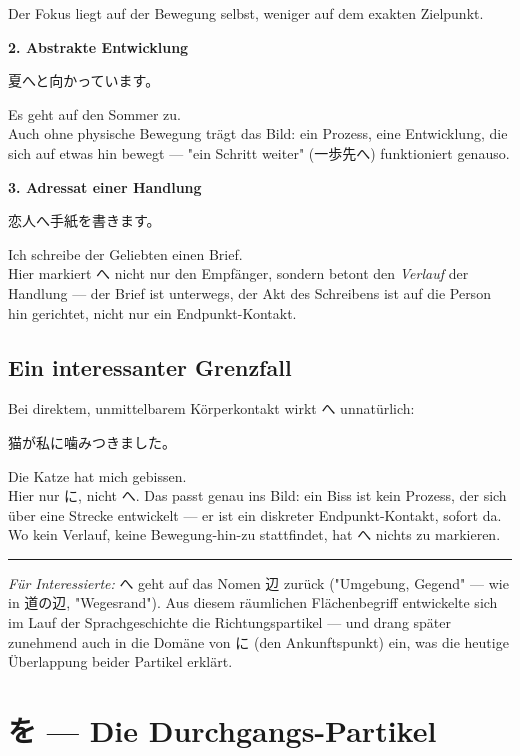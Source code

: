 \documentclass[12pt]{book}
\begin{document}
Der Fokus liegt auf der Bewegung selbst, weniger auf dem exakten Zielpunkt.

\textbf{2. Abstrakte Entwicklung}
\par\quad 夏へと向かっています。\\
\par\quad Es geht auf den Sommer zu.\\

Auch ohne physische Bewegung trägt das Bild: ein Prozess, eine Entwicklung, die sich auf etwas hin bewegt — "ein Schritt weiter" (一歩先へ) funktioniert genauso.

\textbf{3. Adressat einer Handlung}
\par\quad 恋人へ手紙を書きます。\\
\par\quad Ich schreibe der Geliebten einen Brief.\\

Hier markiert へ nicht nur den Empfänger, sondern betont den \emph{Verlauf} der Handlung — der Brief ist unterwegs, der Akt des Schreibens ist auf die Person hin gerichtet, nicht nur ein Endpunkt-Kontakt.

\section*{Ein interessanter Grenzfall}

Bei direktem, unmittelbarem Körperkontakt wirkt へ unnatürlich:

\par\quad 猫が私に噛みつきました。\\
\par\quad Die Katze hat mich gebissen.\\

Hier nur に, nicht へ. Das passt genau ins Bild: ein Biss ist kein Prozess, der sich über eine Strecke entwickelt — er ist ein diskreter Endpunkt-Kontakt, sofort da. Wo kein Verlauf, keine Bewegung-hin-zu stattfindet, hat へ nichts zu markieren.

\bigskip\hrule\bigskip

\emph{Für Interessierte:} へ geht auf das Nomen 辺 zurück ("Umgebung, Gegend" — wie in 道の辺, "Wegesrand"). Aus diesem räumlichen Flächenbegriff entwickelte sich im Lauf der Sprachgeschichte die Richtungspartikel — und drang später zunehmend auch in die Domäne von に (den Ankunftspunkt) ein, was die heutige Überlappung beider Partikel erklärt.


\chapter{を — Die Durchgangs-Partikel}
\end{document}
